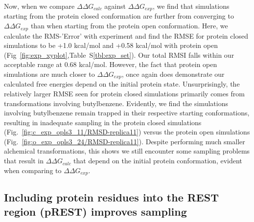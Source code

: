 Now, when we compare $\Delta\Delta G_{calc}$ against $\Delta\Delta G_{exp}$, we find that simulations starting from the protein closed conformation are further from converging to $\Delta\Delta G_{exp}$ than when starting from the protein open conformation.
Here, we calculate the RMS-'Error' with experiment and find the RMSE for protein closed simulations to be +1.0 kcal/mol and +0.58 kcal/mol with protein open (Fig~\ref{fig:exp_xyplot},Table~S\ref{tbl:exp_set}).
Our total RMSI falls within our acceptable range at 0.68 kcal/mol.
However, the fact that protein open simulations are much closer to $\Delta\Delta G_{exp}$, once again does demonstrate our calculated free energies depend on the initial protein state.
Unsurprisingly, the relatively larger RMSE seen for protein closed simulations primarily comes from transformations involving butylbenzene.
Evidently, we find the simulations involving butylbenzene remain trapped in their respective starting conformations, resulting in inadequate sampling in the protein closed simulations (Fig.~\ref{fig:c_exp_opls3_11/RMSD-replica11}) versus the protein open simulations (Fig.~\ref{fig:o_exp_opls3_24/RMSD-replica11}).
Despite performing much smaller alchemical transformations, this shows we still encounter some sampling problems that result in $\Delta\Delta G_{calc}$ that depend on the initial protein conformation, evident when comparing to $\Delta\Delta G_{exp}$.

\subsection{Including protein residues into the REST region (pREST) improves sampling}

